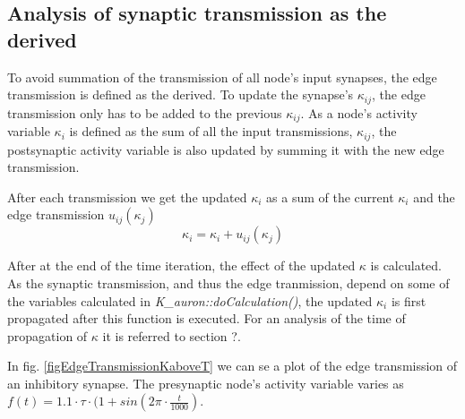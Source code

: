

	



	
	
			\subsection{Analysis of synaptic transmission as the derived}
			To avoid summation of the transmission of all node's input synapses, the edge transmission is defined as the derived.
			To update the synapse's $\kappa_{ij}$, the edge transmission only has to be added to the previous $\kappa_{ij}$. %
			As a node's activity variable $\kappa_i$ is defined as the sum of all the input transmissions, $\kappa_{ij}$,
				the postsynaptic activity variable is also updated by summing it with the new edge transmission.

			After each transmission we get the updated $\kappa_i$ as a sum of the current $\kappa_i$ and the edge transmission $u_{ij}(\kappa_j)$
			\begin{equation}
				\kappa_i = \kappa_i + u_{ij}(\kappa_j)
			\end{equation}
			
			After at the end of the time iteration, the effect of the updated $\kappa$ is calculated.
			As the synaptic transmission, and thus the edge tranmission, depend on some of the variables calculated in \emph{K\_auron::doCalculation()}, the updated $\kappa_i$ is first propagated after this function is executed.
			For an analysis of the time of propagation of $\kappa$ it is referred to section ?. %

			In fig. \ref{figEdgeTransmissionKaboveT} we can se a plot of the edge transmission of an inhibitory synapse.
			The presynaptic node's activity variable varies as \mbox{$f(t) = 1.1 \cdot \tau \cdot (1 + sin( 2\pi \cdot \frac{t}{1000})$}.
	

